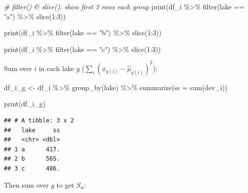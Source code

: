 \documentclass[
]{book}
\newenvironment{Shaded}{\begin{snugshade}}{\end{snugshade}}
\newcommand{\AttributeTok}[1]{\textcolor[rgb]{0.77,0.63,0.00}{#1}}
\newcommand{\CommentTok}[1]{\textcolor[rgb]{0.56,0.35,0.01}{\textit{#1}}}
\newcommand{\DecValTok}[1]{\textcolor[rgb]{0.00,0.00,0.81}{#1}}
\newcommand{\FunctionTok}[1]{\textcolor[rgb]{0.00,0.00,0.00}{#1}}
\newcommand{\NormalTok}[1]{#1}
\newcommand{\OtherTok}[1]{\textcolor[rgb]{0.56,0.35,0.01}{#1}}
\newcommand{\SpecialCharTok}[1]{\textcolor[rgb]{0.00,0.00,0.00}{#1}}
\newcommand{\StringTok}[1]{\textcolor[rgb]{0.31,0.60,0.02}{#1}}
\begin{document}
\begin{Shaded}
\begin{Highlighting}[]
\CommentTok{\# filter() \& slice(): show first 3 rows each group}
\FunctionTok{print}\NormalTok{(df\_i }\SpecialCharTok{\%\textgreater{}\%} \FunctionTok{filter}\NormalTok{(lake }\SpecialCharTok{==} \StringTok{"a"}\NormalTok{) }\SpecialCharTok{\%\textgreater{}\%} \FunctionTok{slice}\NormalTok{(}\DecValTok{1}\SpecialCharTok{:}\DecValTok{3}\NormalTok{))}

\FunctionTok{print}\NormalTok{(df\_i }\SpecialCharTok{\%\textgreater{}\%} \FunctionTok{filter}\NormalTok{(lake }\SpecialCharTok{==} \StringTok{"b"}\NormalTok{) }\SpecialCharTok{\%\textgreater{}\%} \FunctionTok{slice}\NormalTok{(}\DecValTok{1}\SpecialCharTok{:}\DecValTok{3}\NormalTok{))}

\FunctionTok{print}\NormalTok{(df\_i }\SpecialCharTok{\%\textgreater{}\%} \FunctionTok{filter}\NormalTok{(lake }\SpecialCharTok{==} \StringTok{"c"}\NormalTok{) }\SpecialCharTok{\%\textgreater{}\%} \FunctionTok{slice}\NormalTok{(}\DecValTok{1}\SpecialCharTok{:}\DecValTok{3}\NormalTok{))}
\end{Highlighting}
\end{Shaded}

Sum over \(i\) in each lake \(g\) (\(\sum_i (x_{g(i)} - \hat{\mu}_{g(i)})^2\)):

\begin{Shaded}
\begin{Highlighting}[]
\NormalTok{df\_i\_g }\OtherTok{\textless{}{-}}\NormalTok{ df\_i }\SpecialCharTok{\%\textgreater{}\%} 
  \FunctionTok{group\_by}\NormalTok{(lake) }\SpecialCharTok{\%\textgreater{}\%} 
  \FunctionTok{summarize}\NormalTok{(}\AttributeTok{ss =} \FunctionTok{sum}\NormalTok{(dev\_i))}

\FunctionTok{print}\NormalTok{(df\_i\_g)}
\end{Highlighting}
\end{Shaded}

\begin{verbatim}
## # A tibble: 3 x 2
##   lake     ss
##   <chr> <dbl>
## 1 a      417.
## 2 b      565.
## 3 c      486.
\end{verbatim}

Then sum over \(g\) to get \(S_w\):

\begin{Shaded}
\end{Shaded}
\end{document}
